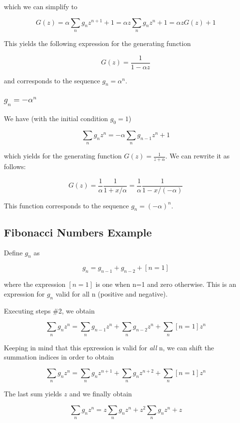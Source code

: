which we can simplify to

\[G(z) = \alpha \sum_n g_{n} z^{n+1} + 1 = \alpha z \sum_n g_n z^n +1 = \alpha z G(z) + 1\]

This yields the following expression for the generating function

\[ G(z) = \frac{1}{1-\alpha z} \]

and corresponds to the sequence $g_n = \alpha^n$.

\subsubsection{\texorpdfstring{\(g_n=-\alpha^n\)}{g\_n=-\textbackslash{}alpha\^{}n}}\label{g_n-alphan}

We have (with the initial condition \(g_0=1\))

\[\sum_n g_n z^n = -\alpha \sum_n g_{n-1} z^n + 1\]

which yields for the generating function $G(z) = \frac{1}{z+\alpha}$. We can rewrite it as follows:

\[G(z) = \frac{1}{\alpha} \frac{1}{1 + x/\alpha} = \frac{1}{\alpha} \frac{1}{1 - x/(-\alpha)} \]

This function corresponds to the sequence \(g_n = (-\alpha)^n\).

\subsection{Fibonacci Numbers Example}\label{fibonacci-numbers-example}

Define \(g_n\) as

\[ g_n = g_{n-1} + g_{n-2} + [n=1] \]

where the expression \([n=1]\) is one when n=1 and zero otherwise. This
is an expression for \(g_n\) valid for all n (positive and negative).

Executing steps \#2, we obtain

\[ \sum_n g_n z^n = \sum_n g_{n-1} z^n + \sum_n g_{n-2} z^n  + \sum_n [n=1] z^n \]

Keeping in mind that this epxression is valid for \emph{all} n, we can
shift the summation indices in order to obtain

\[ \sum_n g_n z^n = \sum_n g_{n} z^{n+1} + \sum_n g_{n} z^{n+2}  + \sum_n [n=1] z^n \]

The last sum yields \(z\) and we finally obtain

\[ \sum_n g_n z^n = z \sum_n g_{n} z^n + z^2 \sum_n g_{n} z^n + z \]

